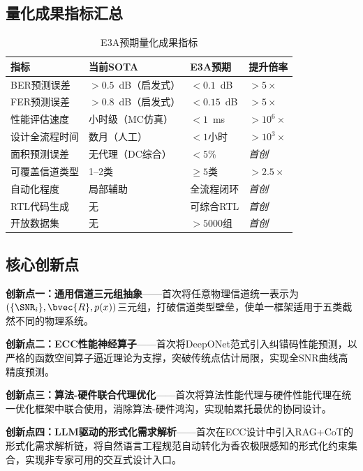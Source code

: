 \subsection{量化成果指标汇总}

\begin{table}[htbp]
\centering
\caption{E3A预期量化成果指标}
\label{tab:outcomes_quant}
\setlength{\tabcolsep}{5pt}
\begin{tabular}{@{}L{3.2cm}L{3.5cm}L{3.5cm}L{2.5cm}@{}}
\toprule
\textbf{指标} & \textbf{当前SOTA} & \textbf{E3A预期} & \textbf{提升倍率} \\
\midrule
BER预测误差 & $>0.5$~dB（启发式） & $<0.1$~dB & $>5\times$ \\
FER预测误差 & $>0.8$~dB（启发式） & $<0.15$~dB & $>5\times$ \\
性能评估速度 & 小时级（MC仿真） & $<1$~ms & $>10^6\times$ \\
设计全流程时间 & 数月（人工） & $<1$小时 & $>10^3\times$ \\
面积预测误差 & 无代理（DC综合） & $<5\%$ & \textit{首创} \\
可覆盖信道类型 & 1--2类 & $\geq 5$类 & $>2.5\times$ \\
自动化程度 & 局部辅助 & 全流程闭环 & \textit{首创} \\
RTL代码生成 & 无 & 可综合RTL & \textit{首创} \\
开放数据集 & 无 & $>5000$组 & \textit{首创} \\
\bottomrule
\end{tabular}
\end{table}

\subsection{核心创新点}

\textbf{创新点一：通用信道三元组抽象}——首次将任意物理信道统一表示为$(\{\SNR_i\},\bvec{R},p(x))$三元组，打破信道类型壁垒，使单一框架适用于五类截然不同的物理系统。

\textbf{创新点二：ECC性能神经算子}——首次将DeepONet范式引入纠错码性能预测，以严格的函数空间算子逼近理论为支撑，突破传统点估计局限，实现全SNR曲线高精度预测。

\textbf{创新点三：算法-硬件联合代理优化}——首次将算法性能代理与硬件性能代理在统一优化框架中联合使用，消除算法-硬件鸿沟，实现帕累托最优的协同设计。

\textbf{创新点四：LLM驱动的形式化需求解析}——首次在ECC设计中引入RAG+CoT的形式化需求解析链，将自然语言工程规范自动转化为香农极限感知的形式化约束集合，实现非专家可用的交互式设计入口。